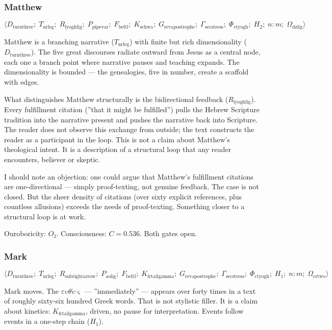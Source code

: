 \documentclass[12pt,a4paper]{article}
\begin{document}
\subsubsection{Matthew}

\[\langle D_{\text{turnthree}};\; T_{\text{nrleg}};\; R_{\text{lyoghlig}};\; P_{\text{pipevar}};\; F_{\text{beltl}};\; K_{\text{schwa}};\; G_{\text{revapostrophe}};\; \Gamma_{\text{secstress}};\; \Phi_{\text{ctyogh}};\; H_2;\; n{:}m;\; \Omega_{\text{dzlig}} \rangle\]

Matthew is a branching narrative ($T_{\text{nrleg}}$) with finite but rich dimensionality ($D_{\text{turnthree}}$). The five great discourses radiate outward from Jesus as a central node, each one a branch point where narrative pauses and teaching expands. The dimensionality is bounded --- the genealogies, five in number, create a scaffold with edges.

What distinguishes Matthew structurally is the bidirectional feedback ($R_{\text{lyoghlig}}$). Every fulfillment citation (''that it might be fulfilled'') pulls the Hebrew Scripture tradition into the narrative present and pushes the narrative back into Scripture. The reader does not observe this exchange from outside; the text constructs the reader as a participant in the loop. This is not a claim about Matthew's theological intent. It is a description of a structural loop that any reader encounters, believer or skeptic.

I should note an objection: one could argue that Matthew's fulfillment citations are one-directional --- simply proof-texting, not genuine feedback. The case is not closed. But the sheer density of citations (over sixty explicit references, plus countless allusions) exceeds the needs of proof-texting. Something closer to a structural loop is at work.

Ouroboricity: $O₂$. Consciousness: $C = 0.536$. Both gates open.

\subsubsection{Mark}

\[\langle D_{\text{turnthree}};\; T_{\text{nrleg}};\; R_{\text{subrightarrow}};\; P_{\text{aolig}};\; F_{\text{beltl}};\; K_{\text{frtailgamma}};\; G_{\text{revapostrophe}};\; \Gamma_{\text{secstress}};\; \Phi_{\text{ctyogh}};\; H_1;\; n{:}m;\; \Omega_{\text{crtwo}} \rangle\]

Mark moves. The $\varepsilon\upsilon\theta\acute{\upsilon}\varsigma$ --- ''immediately'' --- appears over forty times in a text of roughly sixty-six hundred Greek words. That is not stylistic filler. It is a claim about kinetics: $K_{\text{frtailgamma}}$, driven, no pause for interpretation. Events follow events in a one-step chain ($H_1$).
\end{document}
